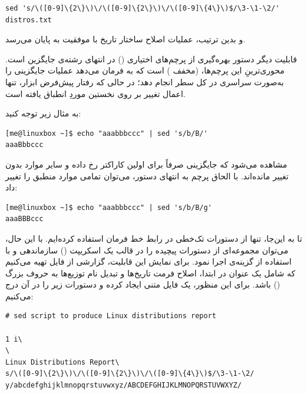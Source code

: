 \begin{latin}
\begin{lstlisting}
sed 's/\([0-9]\{2\}\)\/\([0-9]\{2\}\)\/\([0-9]\{4\}\)$/\3-\1-\2/' distros.txt
\end{lstlisting}
\end{latin}

و بدین ترتیب، عملیات اصلاح ساختار تاریخ با موفقیت به پایان می‌رسد.

قابلیت دیگر دستور  بهره‌گیری از پرچم‌های اختیاری () در انتهای رشته‌ی جایگزین است. محوری‌ترینِ این پرچم‌ها،  (مخفف ) است که به  فرمان می‌دهد عملیات جایگزینی را به‌صورت سراسری در کل سطر انجام دهد؛ در حالی که رفتار پیش‌فرض ابزار، تنها اعمال تغییر بر روی نخستین موردِ انطباق یافته است.

به مثال زیر توجه کنید:

\begin{latin}
\begin{lstlisting}
[me@linuxbox ~]$ echo "aaabbbccc" | sed 's/b/B/'
aaaBbbccc
\end{lstlisting}
\end{latin}

مشاهده می‌شود که جایگزینی صرفاً برای اولین کاراکتر  رخ داده و سایر موارد بدون تغییر مانده‌اند. با الحاق پرچم  به انتهای دستور، می‌توان تمامی موارد منطبق را تغییر داد:

\begin{latin}
\begin{lstlisting}
[me@linuxbox ~]$ echo "aaabbbccc" | sed 's/b/B/g'
aaaBBBccc
\end{lstlisting}
\end{latin}

تا به این‌جا، تنها از دستورات تک‌خطی در رابط خط فرمان استفاده کرده‌ایم. با این حال، می‌توان مجموعه‌ای از دستورات پیچیده را در قالب یک اسکریپت () سازماندهی و با استفاده از گزینه‌ی  اجرا نمود. برای نمایش این قابلیت، گزارشی از فایل  تهیه می‌کنیم که شامل یک عنوان در ابتدا، اصلاح فرمت تاریخ‌ها و تبدیل نام توزیع‌ها به حروف بزرگ () باشد. برای این منظور، یک فایل متنی ایجاد کرده و دستورات زیر را در آن درج می‌کنیم:

\begin{latin}
\begin{lstlisting}
# sed script to produce Linux distributions report

1 i\
\
Linux Distributions Report\
s/\([0-9]\{2\}\)\/\([0-9]\{2\}\)\/\([0-9]\{4\}\)$/\3-\1-\2/
y/abcdefghijklmnopqrstuvwxyz/ABCDEFGHIJKLMNOPQRSTUVWXYZ/
\end{lstlisting}
\end{latin}

